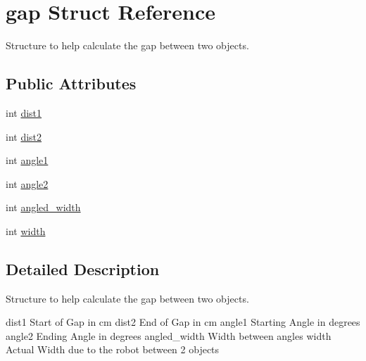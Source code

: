 \hypertarget{structgap}{
\section{gap Struct Reference}
\label{structgap}
}


Structure to help calculate the gap between two objects.  


\subsection*{Public Attributes}
\begin{DoxyCompactItemize}
\item 
int \hyperlink{structgap_aa48958ad51bcf6b1a2ad8b4d0aa1ea98}{dist1}
\item 
int \hyperlink{structgap_ae02e438f36655218b9336b4c72a6f571}{dist2}
\item 
int \hyperlink{structgap_a17dbc8bf80a688022980b16e19578ec7}{angle1}
\item 
int \hyperlink{structgap_a2108c6c9b6cbfbd92801a31768c8f3e3}{angle2}
\item 
int \hyperlink{structgap_a141c484cd04a6a8b9bd52e970c5c46e7}{angled\_\-width}
\item 
int \hyperlink{structgap_a52141682fa04fedf9e985d8dd7518947}{width}
\end{DoxyCompactItemize}


\subsection{Detailed Description}
Structure to help calculate the gap between two objects. 

dist1 Start of Gap in cm dist2 End of Gap in cm angle1 Starting Angle in degrees angle2 Ending Angle in degrees angled\_\-width Width between angles width Actual Width due to the robot between 2 objects 


